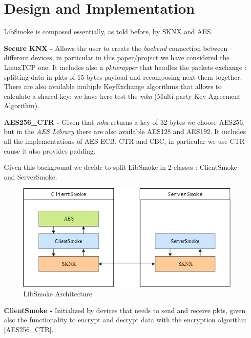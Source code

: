 \section{Design and Implementation}
LibSmoke is composed essentially, as told before, by SKNX and AES.\par
\vspace{5mm}
\textbf{Secure KNX - }Allows the user to create the \emph{backend} connection between different devices, in particular in this paper/project we have considered the LinuxTCP one. It includes also a \emph{pktwrapper} that handles the packets exchange : splitting data in pkts of 15 bytes payload and recomposing next them together. There are also available multiple KeyExchange algorithms that allows to calculate a shared key; we have here test the \emph{mka} (Multi-party Key Agreement Algorithm).\par
\vspace{5mm}
\textbf{AES256\_CTR - }Given that \emph{mka} returns a key of 32 bytes we choose AES256, but in the \emph{AES Library} there are also available AES128 and AES192. It includes all the implementations of AES ECB, CTR and CBC, in particular we use CTR cause it also provides padding.\par
\vspace{5mm}
Given this background we decide to split LibSmoke in 2 classes : ClientSmoke and ServerSmoke.

\vspace{0.5cm}
\begin{figure}[h]
	\centering
	\includegraphics[scale=0.7]{Images/Diagrams/Architecture}
	\caption{LibSmoke Architecture}
\end{figure}
\vspace{0.2cm}

\newpage
\textbf{ClientSmoke - }Initialized by devices that needs to send and receive pkts, given also the functionality to encrypt and decrypt data with the encryption algorithm [AES256\_CTR].

\begin{lstlisting}[language=C++, caption={ClientSmoke}]

\end{lstlisting}
